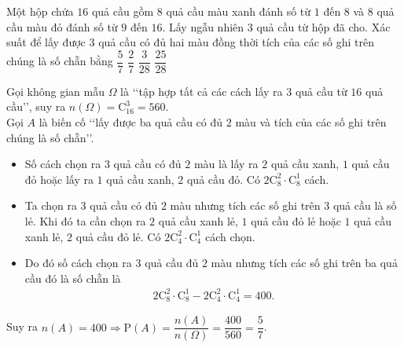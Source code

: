 \begin{ex}%
	Một hộp chứa $16$ quả cầu gồm $8$ quả cầu màu xanh đánh số từ $1$ đến $8$ và $8$ quả cầu màu đỏ đánh số từ $9$ đến $16$. Lấy ngẫu nhiên $3$ quả cầu từ hộp đã cho. Xác suất để lấy được $3$ quả cầu có đủ hai màu đồng thời tích của các số ghi trên chúng là số chẵn bằng
	\choice
	{\True $\dfrac{5}{7}$}
	{$\dfrac{2}{7}$}
	{$\dfrac{3}{28}$}
	{$\dfrac{25}{28}$}
	\loigiai
	{
		Gọi không gian mẫu $\Omega$ là \lq\lq  tập hợp tất cả các cách lấy ra $3$ quả cầu từ $16$ quả cầu\rq\rq, suy ra $n\left(\Omega\right)=\mathrm{C}_{16}^3=560$.\\
		Gọi $A$ là biến cố \lq\lq  lấy được ba quả cầu có đủ $2$ màu và tích của các số ghi trên chúng là số chẵn\rq\rq. 
		\begin{itemize}
			\item Số cách chọn ra $3$ quả cầu có đủ $2$ màu là lấy ra $2$ quả cầu xanh, $1$ quả cầu đỏ hoặc lấy ra $1$ quả cầu xanh, $2$ quả cầu đỏ. Có $2\mathrm{C}_{8}^2\cdot \mathrm{C}_{8}^1$  cách.
			\item Ta chọn ra $3$ quả cầu có đủ $2$ màu nhưng tích các số ghi trên $3$ quả cầu là số lẻ. Khi đó ta cần chọn ra $2$ quả cầu xanh lẻ, $1$ quả cầu đỏ lẻ hoặc $1$ quả cầu xanh lẻ, $2$ quả cầu đỏ lẻ. Có $2\mathrm{C}_4^2\cdot \mathrm{C}_{4}^1$ cách chọn.
			\item Do đó số cách chọn ra $3$ quả cầu đủ $2$ màu nhưng tích các số ghi trên ba quả cầu đó là số chẵn là
			\begin{align*}
				2\mathrm{C}_{8}^2\cdot \mathrm{C}_{8}^1-2\mathrm{C}_{4}^2\cdot \mathrm{C}_{4}^1=400.
			\end{align*}
		\end{itemize}
		Suy ra $n\left(A\right)=400\Rightarrow \mathrm{P}(A)=\dfrac{n(A)}{n\left(\Omega\right)}=\dfrac{400}{560}=\dfrac{5}{7}$.
	}
\end{ex}

